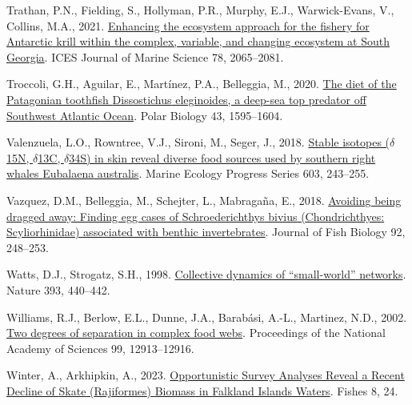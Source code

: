 \documentclass[preprint, 3p,
authoryear]{elsarticle} %
\newlength{\cslhangindent}
\newlength{\cslentryspacingunit} %
\newenvironment{CSLReferences}[2] %
 {%
  \setlength{\parindent}{0pt}
  \ifodd #1
  \let\oldpar\par
  \def\par{\hangindent=\cslhangindent\oldpar}
  \fi
  \setlength{\parskip}{#2\cslentryspacingunit}
 }%
 {}
\begin{document}
\begin{CSLReferences}{1}{0}
\leavevmode{}%
Trathan, P.N., Fielding, S., Hollyman, P.R., Murphy, E.J.,
Warwick-Evans, V., Collins, M.A., 2021.
\href{https://doi.org/10.1093/icesjms/fsab092}{Enhancing the ecosystem
approach for the fishery for {Antarctic} krill within the complex,
variable, and changing ecosystem at {South Georgia}}. ICES Journal of
Marine Science 78, 2065--2081.

\leavevmode{}%
Troccoli, G.H., Aguilar, E., Martínez, P.A., Belleggia, M., 2020.
\href{https://doi.org/10.1007/s00300-020-02730-2}{The diet of the
{Patagonian} toothfish {Dissostichus} eleginoides, a deep-sea top
predator off {Southwest Atlantic Ocean}}. Polar Biology 43, 1595--1604.

\leavevmode{}%
Valenzuela, L.O., Rowntree, V.J., Sironi, M., Seger, J., 2018.
\href{https://doi.org/10.3354/meps12722}{Stable isotopes
({\(\delta\)15N}, {\(\delta\)13C}, {\(\delta\)34S}) in skin reveal
diverse food sources used by southern right whales {Eubalaena}
australis}. Marine Ecology Progress Series 603, 243--255.

\leavevmode{}%
Vazquez, D.M., Belleggia, M., Schejter, L., Mabragaña, E., 2018.
\href{https://doi.org/10.1111/jfb.13490}{Avoiding being dragged away:
Finding egg cases of {Schroederichthys} bivius ({Chondrichthyes}:
{Scyliorhinidae}) associated with benthic invertebrates}. Journal of
Fish Biology 92, 248--253.

\leavevmode{}%
Watts, D.J., Strogatz, S.H., 1998.
\href{https://doi.org/10.1038/30918}{Collective dynamics of
{``small-world''} networks}. Nature 393, 440--442.

\leavevmode{}%
Williams, R.J., Berlow, E.L., Dunne, J.A., Barabási, A.-L., Martinez,
N.D., 2002. \href{https://doi.org/10.1073/pnas.192448799}{Two degrees of
separation in complex food webs}. Proceedings of the National Academy of
Sciences 99, 12913--12916.

\leavevmode{}%
Winter, A., Arkhipkin, A., 2023.
\href{https://doi.org/10.3390/fishes8010024}{Opportunistic {Survey
Analyses Reveal} a {Recent Decline} of {Skate} ({Rajiformes}) {Biomass}
in {Falkland Islands Waters}}. Fishes 8, 24.

\end{CSLReferences}
\end{document}

